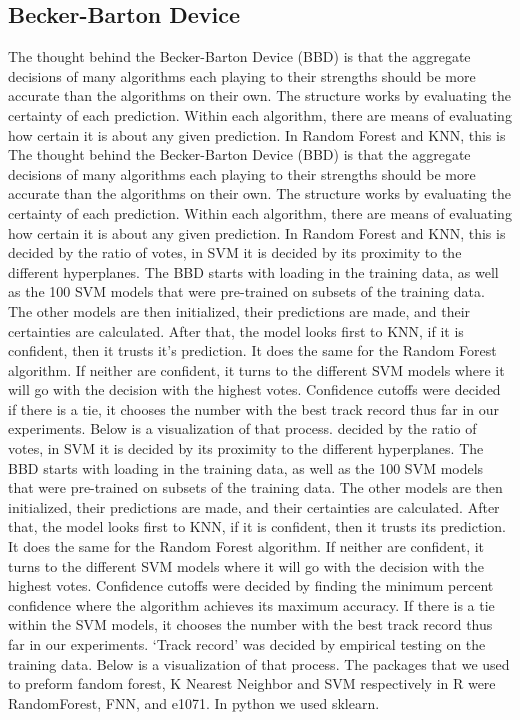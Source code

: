 \documentclass[11pt, oneside]{article}   	%
\begin{document}
\subsection{Becker-Barton Device}
The thought behind the Becker-Barton Device (BBD) is that the aggregate decisions of many algorithms each playing to their strengths should be more accurate than the algorithms on their own. The structure works by evaluating the certainty of each prediction. Within each algorithm, there are means of evaluating how certain it is about any given prediction. In Random Forest and KNN, this is The thought behind the Becker-Barton Device (BBD) is that the aggregate decisions of many algorithms each playing to their strengths should be more accurate than the algorithms on their own. The structure works by evaluating the certainty of each prediction. Within each algorithm, there are means of evaluating how certain it is about any given prediction. In Random Forest and KNN, this is decided by the ratio of votes, in SVM it is decided by its proximity to the different hyperplanes. The BBD starts with loading in the training data, as well as the 100 SVM models that were pre-trained on subsets of the training data. The other models are then initialized, their predictions are made, and their certainties are calculated. After that, the model looks first to KNN, if it is confident, then it trusts it's prediction. It does the same for the Random Forest algorithm. If neither are confident, it turns to the different SVM models where it will go with the decision with the highest votes. Confidence cutoffs were decided  if there is a tie, it chooses the number with the best track record thus far in our experiments. Below is a visualization of that process. decided by the ratio of votes, in SVM it is decided by its proximity to the different hyperplanes. The BBD starts with loading in the training data, as well as the 100 SVM models that were pre-trained on subsets of the training data. The other models are then initialized, their predictions are made, and their certainties are calculated. After that, the model looks first to KNN, if it is confident, then it trusts its prediction. It does the same for the Random Forest algorithm. If neither are confident, it turns to the different SVM models where it will go with the decision with the highest votes. Confidence cutoffs were decided by finding the minimum percent confidence where the algorithm achieves its maximum accuracy. If there is a tie within the SVM models, it chooses the number with the best track record thus far in our experiments. `Track record' was decided by empirical testing on the training data. Below is a visualization of that process. The packages that we used to preform fandom forest, K Nearest Neighbor and SVM  respectively in R were RandomForest, FNN, and e1071. In python we used sklearn.
\end{document}
